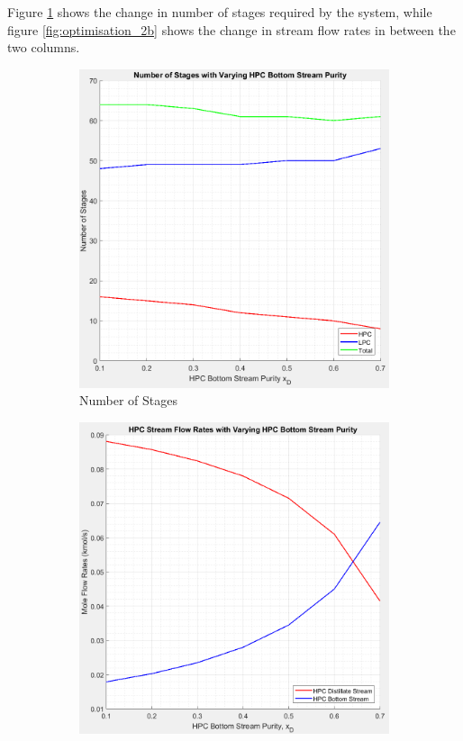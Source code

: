     \noindent Figure \ref{fig:optimisation_2a} shows the change in number of stages required by the system, while figure \ref{fig:optimisation_2b} shows the change in stream flow rates in between the two columns. \\
    \begin{figure}[ht]
        \centering
        \begin{subfigure}{0.49\textwidth}
            \includegraphics[width=\linewidth]{graph-stages_vs_HPCxB.jpeg}
            \caption{Number of Stages} \label{fig:optimisation_2a}
        \end{subfigure}
        \hspace*{\fill} %
        \begin{subfigure}{0.49\textwidth}
            \includegraphics[width=\linewidth]{graph-flowrate_vs_HPCxB.jpeg}

\end{subfigure}
\end{figure}
